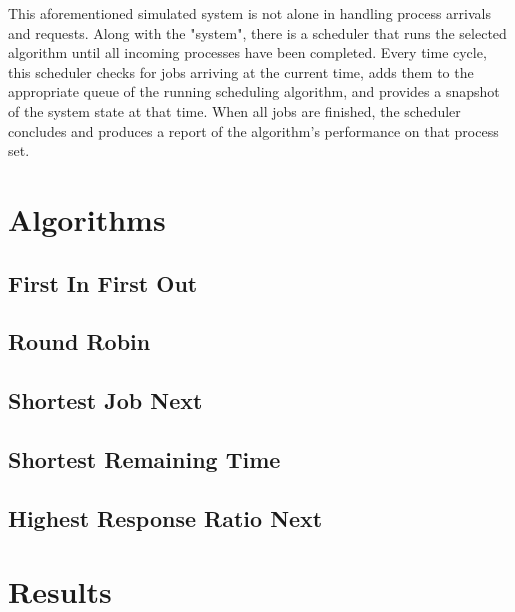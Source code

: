 \documentclass[conference,11pt]{IEEEtran}
\begin{document}
This aforementioned simulated system is not alone in handling process arrivals and requests. Along with the "system", there is a scheduler that runs the selected algorithm until all incoming processes have been completed. Every time cycle, this scheduler checks for jobs arriving at the current time, adds them to the appropriate queue of the running scheduling algorithm, and provides a snapshot of the system state at that time. When all jobs are finished, the scheduler concludes and produces a report of the algorithm's performance on that process set.

\section{Algorithms}


\subsection{First In First Out}


\subsection{Round Robin}


\subsection{Shortest Job Next}


\subsection{Shortest Remaining Time}


\subsection{Highest Response Ratio Next}


\section{Results}
\end{document}
